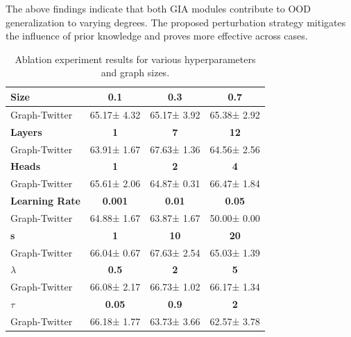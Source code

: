 \documentclass[a4paper,fleqn]{cas-dc}
\begin{document}
{\color{blue}The above findings indicate that both GIA modules contribute to OOD generalization to varying degrees. The proposed perturbation strategy mitigates the influence of prior knowledge and proves more effective across cases.}
\begin{table}%
\caption{{\color{blue}Ablation experiment results for various hyperparameters and graph sizes.}}
\label{tb7}
\begin{tabular*}{\tblwidth}{@{}LCCC@{}}
\toprule
\textbf{Size} & \textbf{0.1} & \textbf{0.3}  & \textbf{0.7} \\
\midrule
Graph-Twitter & 65.17± 4.32  & 65.17± 3.92     & 65.38± 2.92  \\
\bottomrule

\toprule
\textbf{Layers} & \textbf{1}  & \textbf{7} & \textbf{12} \\
\midrule
Graph-Twitter & 63.91± 1.67     & 67.63± 1.36  & 64.56± 2.56  \\
\bottomrule


\toprule
\textbf{Heads} & \textbf{1} & \textbf{2} & \textbf{4}  \\
\midrule
Graph-Twitter & 65.61± 2.06  & 64.87± 0.31   & 66.47± 1.84   \\
\bottomrule

\toprule
\textbf{Learning Rate} & \textbf{0.001} & \textbf{0.01} & \textbf{0.05}  \\
\midrule
Graph-Twitter & 64.88± 1.67  & 63.87± 1.67   & 50.00± 0.00   \\
\bottomrule


\toprule
\textbf{s} & \textbf{1} & \textbf{10} & \textbf{20}  \\
\midrule
Graph-Twitter & 66.04± 0.67  &67.63± 2.54   &65.03± 1.39   \\
\bottomrule

\toprule
\textbf{$\lambda$} & \textbf{0.5} & \textbf{2} & \textbf{5}  \\
\midrule
Graph-Twitter & 66.08± 2.17  & 66.73± 1.02   & 66.17± 1.34   \\
\bottomrule

\toprule
\textbf{$\tau$} & \textbf{0.05} & \textbf{0.9} & \textbf{2}  \\
\midrule
Graph-Twitter & 66.18± 1.77  & 63.73± 3.66   & 62.57± 3.78   \\
\bottomrule

\end{tabular*}
\end{table}
\end{document}

